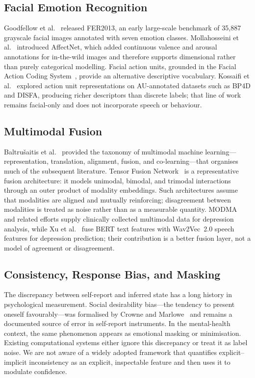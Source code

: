 \documentclass[12pt]{article}
\begin{document}
\subsection{Facial Emotion Recognition}

Goodfellow et al.~\cite{goodfellow2013fer} released FER2013, an early
large-scale benchmark of 35{,}887 grayscale facial images annotated with
seven emotion classes. Mollahosseini et
al.~\cite{mollahosseini2017affectnet} introduced AffectNet, which added
continuous valence and arousal annotations for in-the-wild images and
therefore supports dimensional rather than purely categorical modelling.
Facial action units, grounded in the Facial Action Coding
System~\cite{ekman1978facs}, provide an alternative descriptive
vocabulary. Kossaifi et al.~\cite{kossaifi2019action} explored action
unit representations on AU-annotated datasets such as BP4D and DISFA,
producing richer descriptors than discrete labels; that line of work
remains facial-only and does not incorporate speech or behaviour.

\subsection{Multimodal Fusion}

Baltru\v{s}aitis et al.~\cite{baltrusaitis2018multimodal} provided the
taxonomy of multimodal machine learning---representation, translation,
alignment, fusion, and co-learning---that organises much of the
subsequent literature. Tensor Fusion Network~\cite{zadeh2017tensor} is a
representative fusion architecture: it models unimodal, bimodal, and
trimodal interactions through an outer product of modality embeddings.
Such architectures assume that modalities are aligned and mutually
reinforcing; disagreement between modalities is treated as noise rather
than as a measurable quantity. MODMA~\cite{liu2022modma} and
related efforts supply clinically collected multimodal data for
depression analysis, while Xu et al.~\cite{xu2025multimodal} fuse BERT
text features with Wav2Vec~2.0 speech features for depression
prediction; their contribution is a better fusion layer, not a model of
agreement or disagreement.

\subsection{Consistency, Response Bias, and Masking}

The discrepancy between self-report and inferred state has a long
history in psychological measurement. Social desirability
bias---the tendency to present oneself favourably---was formalised by
Crowne and Marlowe~\cite{crowne1960social} and remains a documented
source of error in self-report instruments. In the mental-health
context, the same phenomenon appears as emotional masking or
minimisation. Existing computational systems either ignore this
discrepancy or treat it as label noise. We are not aware of a widely
adopted framework that quantifies explicit--implicit inconsistency as
an explicit, inspectable feature and then uses it to modulate
confidence.
\end{document}
